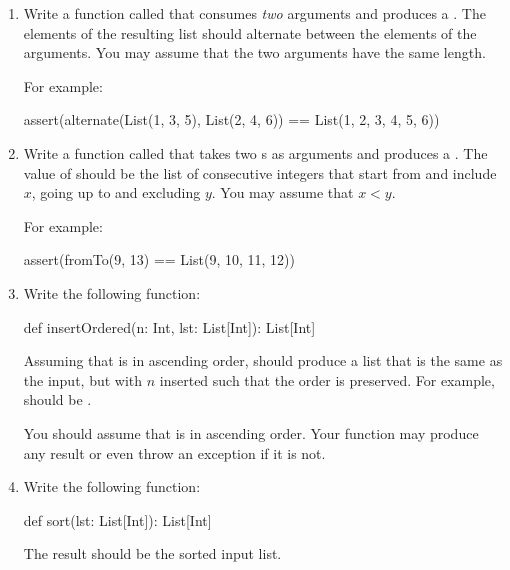 \documentclass{book}
\begin{document}
\begin{enumerate}
  \item Write a function called  that consumes \emph{two}
   arguments and produces a .
  The elements of the resulting list should alternate between the elements of
  the arguments. You may assume that the two arguments have the same
  length.

  For example:

  \begin{scalacode}
  assert(alternate(List(1, 3, 5), List(2, 4, 6)) == List(1, 2, 3, 4, 5, 6))
  \end{scalacode}

  \item Write a function called  that takes
  two s as arguments and produces a .
  The value of  should be the list of consecutive
  integers that start from and include $x$, going up to and excluding $y$.
  You may assume that $x < y$.

  For example:
  \begin{scalacode}
  assert(fromTo(9, 13) == List(9, 10, 11, 12))
  \end{scalacode}

  \item Write the following function:

  \begin{scalacode}
  def insertOrdered(n: Int, lst: List[Int]): List[Int]
  \end{scalacode}

  Assuming that  is in ascending order,
   should produce a list that is the same as
  the input, but with $n$ inserted such that the order is preserved.
  For example,  should be
  .

  You should assume that  is in ascending order. Your function
   may produce any result or even throw an exception if it is not.

   \item Write the following function:

   \begin{scalacode}
   def sort(lst: List[Int]): List[Int]
   \end{scalacode}

   The result should be the sorted input list.

\end{enumerate}
\end{document}
